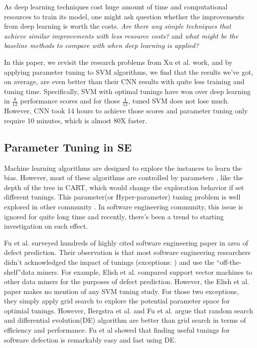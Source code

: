 \documentclass[sigconf,review, anonymous]{acmart}
\theoremstyle{break}
\begin{document}
As deep learning techniques cost huge amount of time and computational
resources to train its model,
one might ask question whether the improvements from deep learning is worth
the costs. {\it Are there any simple techniques that achieve similar improvements
with less resource costs?} and {\it what might be the baseline methods to compare with
when deep learning is applied?}

In this paper, we revisit the research problems 
from Xu et al.\cite{xu2016predicting} work, and by applying parameter tuning 
to SVM algorithms, we find that the results we've got, on average, are even 
better than their CNN results with quite less training and tuning time.
Specifically, SVM with optimal tunings have won over deep learning 
in $\frac{8}{12}$ performance scores and for those $\frac{4}{12}$,
tuned SVM  does not lose much. However, CNN took 14 hours to achieve
those scores and parameter tuning only require 10 minutes, which is almost 80X faster.


\subsection{Parameter Tuning in SE}
Machine learning algorithms are designed to explore the instances
to learn the bias. However, most of these algorithms are controlled by parameters
, like the depth of the tree in CART, which would change the
exploration behavior if set different tunings. This parameter(or Hyper-parameter)
tuning problem is well explored in other community \cite{bergstra2012random,li2016hyperband}.
In software engineering community, this issue is ignored for quite
long time and recently, there's been a trend to starting investigation on such effect.

Fu et al.\cite{fu2016tuning} surveyed hundreds of highly 
cited software engineering paper in area of defect prediction. 
Their observation is that most software engineering  researchers
didn't acknowledged the impact of tunings 
(exceptions: \cite{lessmann2008benchmarking,tantithamthavorn2016automated}) and
use the ``off-the-shelf''data miners. For example, 
Elish et al.\cite{elish2008predicting} compared support vector machines
to other data miners for the purposes of defect prediction.
However, the Elish et al. paper makes no mention of any SVM tuning study.
For those two exceptions\cite{lessmann2008benchmarking,tantithamthavorn2016automated}, 
they simply apply grid search to explore the potential parameter space for optimial tunings.
However, Bergstra et al.\cite{bergstra2012random} and 
Fu et al.\cite{fu2016differential} argue that random search and 
differential evolution(DE) algorithm are better than 
grid search in terms of efficiency and performance.
Fu et al showed that finding useful tunings for software defection is remarkably easy and fast using DE.
\end{document}
